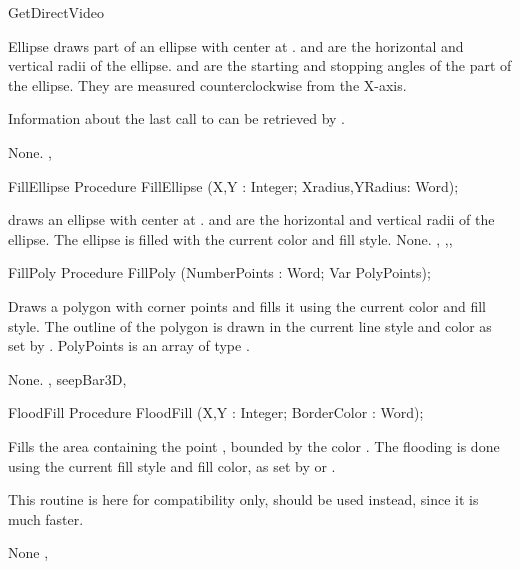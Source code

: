 \begin{function}{GetDirectVideo}
\begin{procedure}{Ellipse}
\Description
  draws part of an ellipse with center at .
 and  are the horizontal and vertical radii of the
ellipse.  and  are the starting and stopping angles of
the part of the ellipse. They are measured counterclockwise from the X-axis.

Information about the last call to  can be retrieved by
.

\Errors
None.
\SeeAlso
{} , 
\end{procedure}
\begin{procedure}{FillEllipse}
\Declaration
Procedure FillEllipse (X,Y : Integer; Xradius,YRadius: Word);

\Description
  draws an ellipse with center at .
 and  are the horizontal and vertical radii of the
ellipse. The ellipse is filled with the current color and fill style.
\Errors
None.
\SeeAlso
{} ,
,, 
\end{procedure}

\begin{procedure}{FillPoly}
\Declaration
Procedure FillPoly (NumberPoints : Word; Var PolyPoints);

\Description

Draws a polygon with  corner points and fills it
using the current color and fill style. The outline of the polygon
is drawn in the current line style and color as set by .
PolyPoints is an array of type .

\Errors
None.
\SeeAlso
{}, seep{Bar3D}, 
\end{procedure}
\begin{procedure}{FloodFill}
\Declaration
Procedure FloodFill (X,Y : Integer; BorderColor : Word);

\Description

Fills the area containing the point , bounded by the color
. The flooding is done using the current fill style
and fill color, as set by  or .

This routine is here for compatibility only,  should be
used instead, since it is much faster.

\Errors
None
\SeeAlso
{},
\end{procedure}


\end{function}
